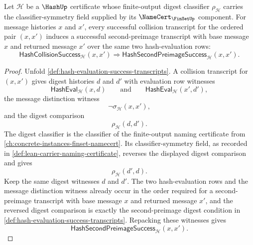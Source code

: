 \begin{theorem}
\label{thm:hash-collision-success-induces-same-direction-second-preimage}
Let $\mathcal H$ be a $\HashUp$ certificate whose finite-output digest classifier $\rho_{\mathcal H}$ carries the classifier-symmetry field supplied by its $\NameCert_{\FinSetUp}$ component. For message histories $x$ and $x'$, every successful collision transcript for the ordered pair $(x,x')$ induces a successful second-preimage transcript with base message $x$ and returned message $x'$ over the same two hash-evaluation rows:
$$
\mathsf{HashCollisionSuccess}_{\mathcal H}(x,x')
\Longrightarrow
\mathsf{HashSecondPreimageSuccess}_{\mathcal H}(x,x').
$$
\end{theorem}
\begin{proof}
Unfold \autoref{def:hash-evaluation-success-transcripts}. A collision transcript for $(x,x')$ gives digest histories $d$ and $d'$ with evaluation row witnesses
$$
\mathsf{HashEval}_{\mathcal H}(x,d)
\qquad\text{and}\qquad
\mathsf{HashEval}_{\mathcal H}(x',d'),
$$
the message distinction witness
$$
\neg\sigma_{\mathcal H}(x,x'),
$$
and the digest comparison
$$
\rho_{\mathcal H}(d,d').
$$
The digest classifier is the classifier of the finite-output naming certificate from \autoref{ch:concrete-instances-finset-namecert}. Its classifier-symmetry field, as recorded in \autoref{def:lean-carrier-naming-certificate}, reverses the displayed digest comparison and gives
$$
\rho_{\mathcal H}(d',d).
$$
Keep the same digest witnesses $d$ and $d'$. The two hash-evaluation rows and the message distinction witness already occur in the order required for a second-preimage transcript with base message $x$ and returned message $x'$, and the reversed digest comparison is exactly the second-preimage digest condition in \autoref{def:hash-evaluation-success-transcripts}. Repacking these witnesses gives
$$
\mathsf{HashSecondPreimageSuccess}_{\mathcal H}(x,x').
$$
\end{proof}

